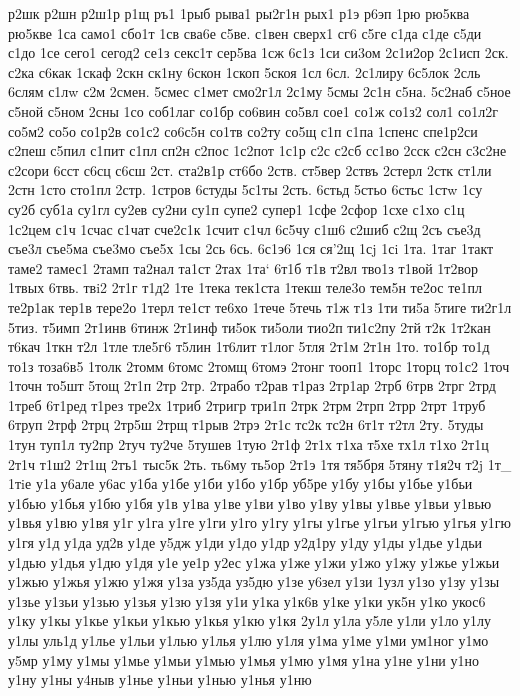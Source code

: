{{р2шк
р2шн
р2ш1р
р1щ
ръ1
1рыб
рыва1
ры2г1н
рых1
р1э
р6эп
1рю
рю5ква
рю5кве
1са
само1
сбо1т
1св
сва6е
с5ве.
с1вен
сверх1
сг6
с5ге
с1да
с1де
с5ди
с1до
1се
сего1
сегод2
се1з
секс1т
сер5ва
1сж
6с1з
1си
си3ом
2с1и2ор
2с1исп
2ск.
с2ка
с6как
1скаф
2скн
ск1ну
6скон
1скоп
5скоя
1сл
6сл.
2с1лиру
6с5лок
2сль
6слям
с1лw
с2м
2смен.
5смес
с1мет
смо2г1л
2с1му
5смы
2с1н
с5на.
5с2наб
с5ное
с5ной
с5ном
2сны
1со
соб1лаг
со1бр
со6вин
со5вл
сое1
со1ж
со1з2
сол1
со1л2г
со5м2
со5о
со1р2в
со1с2
со6с5н
со1тв
со2ту
со5щ
с1п
с1па
1спенс
спе1р2си
с2пеш
с5пил
с1пит
с1пл
сп2н
с2пос
1с2пот
1с1р
с2с
с2сб
сс1во
2сск
с2сн
с3с2не
с2сори
6сст
с6сц
с6сш
2ст.
ста2в1р
ст6бо
2ств.
ст5вер
2ствъ
2стерл
2стк
ст1ли
2стн
1сто
сто1пл
2стр.
1стров
6студы
5с1ты
2сть.
6стьд
5стьо
6стьс
1стw
1су
су2б
суб1а
су1гл
су2ев
су2ни
су1п
супе2
супер1
1сфе
2сфор
1схе
с1хо
с1ц
1с2цем
с1ч
1счас
с1чат
сче2с1к
1счит
с1чл
6с5чу
с1ш6
с2шиб
с2щ
2съ
съе3д
съе3л
съе5ма
съе3мо
съе5х
1сы
2сь
6сь.
6с1э6
1ся
ся'2щ
1сj
1сi
1та.
1таг
1такт
таме2
тамес1
2тамп
та2нал
та1ст
2тах
1та`
6т1б
т1в
т2вл
тво1з
т1вой
1т2вор
1твых
6твь.
твi2
2т1г
т1д2
1те
1тека
тек1ста
1текш
теле3о
тем5н
те2ос
те1пл
те2р1ак
тер1в
тере2о
1терл
те1ст
те6хо
1тече
5течь
т1ж
т1з
1ти
ти5а
5тиге
ти2г1л
5тиз.
т5имп
2т1инв
6тинж
2т1инф
ти5ок
ти5оли
тио2п
ти1с2пу
2тй
т2к
1т2кан
т6кач
1ткн
т2л
1тле
тле5г6
т5лин
1т6лит
т1лог
5тля
2т1м
2т1н
1то.
то1бр
то1д
то1з
тоза6в5
1толк
2томм
6томс
2томщ
6томэ
2тонг
тооп1
1торс
1торц
то1с2
1точ
1точн
то5шт
5тощ
2т1п
2тр
2тр.
2трабо
т2рав
т1раз
2тр1ар
2трб
6трв
2трг
2трд
1треб
6т1ред
т1рез
тре2х
1триб
2тригр
три1п
2трк
2трм
2трп
2трр
2трт
1труб
6труп
2трф
2трц
2тр5ш
2трщ
т1рыв
2трэ
2т1с
тс2к
тс2н
6т1т
т2тл
2ту.
5туды
1тун
туп1л
ту2пр
2туч
ту2че
5тушев
1тую
2т1ф
2т1х
т1ха
т5хе
тх1л
т1хо
2т1ц
2т1ч
т1ш2
2т1щ
2тъ1
тыс5к
2ть.
ть6му
ть5ор
2т1э
1тя
тя5бря
5тяну
т1я2ч
т2j
1т_
1тiе
у1а
у6але
у6ас
у1ба
у1бе
у1би
у1бо
у1бр
уб5ре
у1бу
у1бы
у1бье
у1бьи
у1бью
у1бья
у1бю
у1бя
у1в
у1ва
у1ве
у1ви
у1во
у1ву
у1вы
у1вье
у1вьи
у1вью
у1вья
у1вю
у1вя
у1г
у1га
у1ге
у1ги
у1го
у1гу
у1гы
у1гье
у1гьи
у1гью
у1гья
у1гю
у1гя
у1д
у1да
уд2в
у1де
у5дж
у1ди
у1до
у1др
у2д1ру
у1ду
у1ды
у1дье
у1дьи
у1дью
у1дья
у1дю
у1дя
у1е
уе1р
у2ес
у1жа
у1же
у1жи
у1жо
у1жу
у1жье
у1жьи
у1жью
у1жья
у1жю
у1жя
у1за
уз5да
уз5дю
у1зе
у6зел
у1зи
1узл
у1зо
у1зу
у1зы
у1зье
у1зьи
у1зью
у1зья
у1зю
у1зя
у1и
у1ка
у1к6в
у1ке
у1ки
ук5н
у1ко
укос6
у1ку
у1кы
у1кье
у1кьи
у1кью
у1кья
у1кю
у1кя
2у1л
у1ла
у5ле
у1ли
у1ло
у1лу
у1лы
уль1д
у1лье
у1льи
у1лью
у1лья
у1лю
у1ля
у1ма
у1ме
у1ми
ум1ног
у1мо
у5мр
у1му
у1мы
у1мье
у1мьи
у1мью
у1мья
у1мю
у1мя
у1на
у1не
у1ни
у1но
у1ну
у1ны
у4ныв
у1нье
у1ньи
у1нью
у1нья
у1ню
}}
